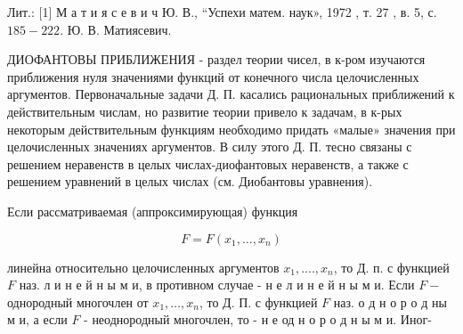 \documentclass[10pt]{article}
\begin{document}
Лит.: [1] М а т и я с е в и ч Ю. В., “Успехи матем. наук», 1972 , т. 27 , в. 5, с. $185-222$. Ю. В. Матиясевич.



ДИОФАНТОВЫ ПРИБЛИЖЕНИЯ - раздел теории чисел, в к-ром изучаются приближения нуля значениями функций от конечного числа целочисленных аргументов. Первоначальные задачи Д. П. касались рациональных приближений к действительным числам, но развитие теории привело к задачам, в к-рых некоторым действительным функциям необходимо придать «малые» значения при целочисленных значениях аргументов. В силу этого Д. П. тесно связаны с решением неравенств в целых числах-диофантовых неравенств, а также с решением уравнений в целых числах (см. Диобантовы уравнения).



Если рассматриваемая (аппроксимирующая) функция



\[

F=F\left(x_{1}, \ldots, x_{n}\right)

\]



линейна относительно целочисленных аргументов $x_{1}, \ldots ., x_{n}$, то Д. п. с функцией $F$ наз. л и н е й н ы м и, в противном случае - н е л и н е й н ы м и. Если $F-$ однородный многочлен от $x_{1}, \ldots, x_{n}$, то Д. П. с функцией $F$ наз. о д н о р о д ны м и, а если $F$ - неоднородный многочлен, то - н е од н о р о д н ы м и. Иног-
\end{document}
